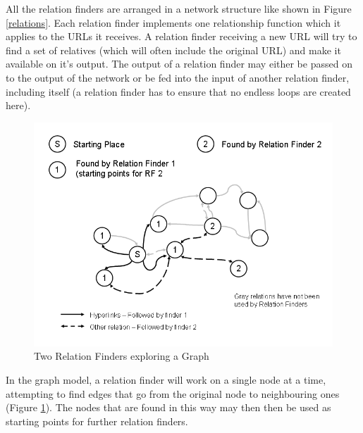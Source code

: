 \documentclass[a4paper]{danarticle}
\theoremstyle{remark}
\begin{document}
       All the relation finders are arranged in a network structure like shown in 
       Figure \ref{relations}. Each relation finder implements one relationship
       function which it applies to the URLs it receives. A relation finder
       receiving a new URL will try to find a set of relatives (which will often
       include the original URL) and make it available on it's output. The
       output of a relation finder may either be passed on to the output of the
       network or be fed into the input of another relation finder, including
       itself (a relation finder has to ensure that no endless loops are created
       here).
       
       \begin{figure}[ht]
        \centering
        \includegraphics[width=12cm]{relationsteps}
        \caption{Two Relation Finders exploring a Graph}
        \label{relationsteps}
      \end{figure}
       
       In the graph model, a relation finder will work on a single node at a 
       time, attempting to find edges that go from the original node to 
       neighbouring ones (Figure \ref{relationsteps}). 
       The nodes that are found in this way may then then be 
       used as starting points for further relation finders.
\end{document}
